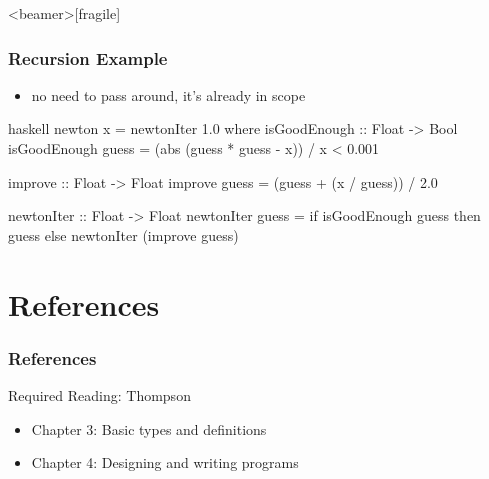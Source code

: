 \documentclass[dvipsnames]{beamer}
\theoremstyle{plain}
\begin{document}
\begin{frame}<beamer>[fragile]
  \frametitle{Recursion Example}

  \begin{exampleblock}{}
    \begin{itemize}
      \item no need to pass  around, it's already in scope
    \end{itemize}

    \pause
    \smallskip
    \begin{pygments}{haskell}
newton x = newtonIter 1.0
  where
    isGoodEnough :: Float -> Bool
    isGoodEnough guess =
        (abs (guess * guess - x)) / x < 0.001

    improve :: Float -> Float
    improve guess = (guess + (x / guess)) / 2.0

    newtonIter :: Float -> Float
    newtonIter guess =
        if isGoodEnough guess
            then guess
            else newtonIter (improve guess)
    \end{pygments}
  \end{exampleblock}
\end{frame}

\section*{References}

\begin{frame}
  \frametitle{References}

  \begin{block}{Required Reading: Thompson}
    \begin{itemize}
      \item Chapter 3: \alert{Basic types and definitions}
      \item Chapter 4: \alert{Designing and writing programs}
    \end{itemize}
  \end{block}
\end{frame}
\end{document}
